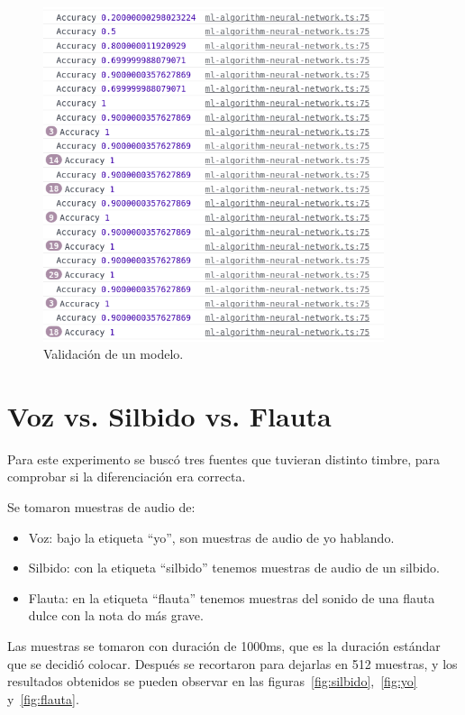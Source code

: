 \documentclass[a4paper, 12pt]{book}
\begin{document}
\begin{figure}
	\centering
	\includegraphics[width=10cm, keepaspectratio]{img/accuracy2.png}
	\caption{Validación de un modelo.}\label{fig:validacion}
\end{figure}

\section{Voz vs. Silbido vs. Flauta}
\label{sec:yo-silv-flauta}

Para este experimento se buscó tres fuentes que tuvieran distinto timbre, para comprobar si la diferenciación era correcta.

Se tomaron muestras de audio de:
\begin{itemize}
	\item Voz: bajo la etiqueta ``yo'', son muestras de audio de yo hablando.
	\item Silbido: con la etiqueta ``silbido'' tenemos muestras de audio de un silbido.
	\item Flauta: en la etiqueta ``flauta'' tenemos muestras del sonido de una flauta dulce con la nota do más grave.
\end{itemize}

Las muestras se tomaron con duración de 1000ms, que es la duración estándar que se decidió colocar. Después se recortaron para dejarlas en 512 muestras, y los resultados obtenidos se pueden observar en las figuras~\ref{fig:silbido},~\ref{fig:yo} y~\ref{fig:flauta}.

\end{document}
